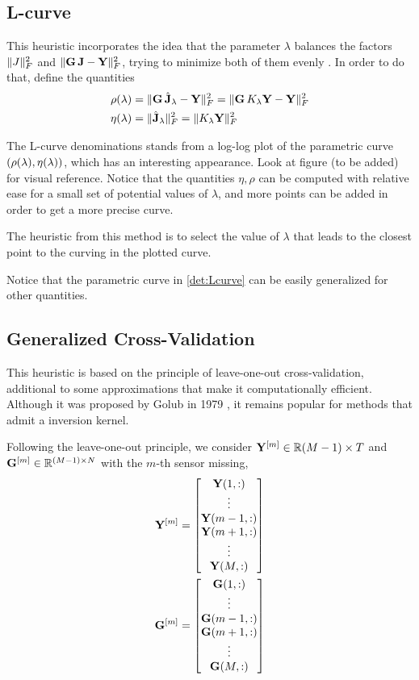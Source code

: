 \subsection{L-curve}

This heuristic incorporates the idea that the parameter $\lambda$ balances the factors $\lVert J \rVert_F^2$ and $\lVert \mathbf{G}\, \mathbf{J} - \mathbf{Y} \rVert_F^2$, trying to minimize both of them evenly \cite{Lcurve}.
%
In order to do that, define the quantities
\begin{align}
\rho(\lambda)
&=
\lVert \mathbf{G}\, \hat{\mathbf{J}}_\lambda - \mathbf{Y} \rVert_F^2
=
\lVert \mathbf{G}\, K_\lambda\mathbf{Y} - \mathbf{Y} \rVert_F^2
\\
\eta(\lambda)
&=
\lVert \hat{\mathbf{J}}_\lambda \rVert_F^2 
= 
\lVert  K_\lambda \mathbf{Y}  \rVert_F^2
\label{det:Lcurve}
\end{align}

The L-curve denominations stands from a log-log plot of the parametric curve $\left( \rho(\lambda), \eta(\lambda)  \right)$, which has an interesting appearance.
%
Look at figure (to be added) for visual reference.
%
Notice that the quantities $\eta, \rho$ can be computed with relative ease for a small set of potential values of $\lambda$, and more points can be added in order to get a more precise curve.

The heuristic from this method is to select the value of $\lambda$ that leads to the closest point to the curving in the plotted curve.

Notice that the parametric curve in \eqref{det:Lcurve} can be easily generalized for other quantities.

\subsection{Generalized Cross-Validation}

This heuristic is based on the principle of leave-one-out cross-validation, additional to some approximations that make it computationally efficient. 
%
Although it was proposed by Golub in 1979 \cite{GCV_Golub}, it remains popular for methods that admit a inversion kernel.

Following the leave-one-out principle, we consider $\mathbf{Y}^{[m]}\in\mathbb{R}{(M-1)\times T}$ and $\mathbf{G}^{[m]} \in \mathbb{R}^{(M-1)\times N}$ with the $m$-th sensor missing,
\begin{align}
\mathbf{Y}^{[m]} &=
\begin{bmatrix}
\mathbf{Y}(1,:) \\
\vdots \\
\mathbf{Y}(m-1,:) \\
\mathbf{Y}(m+1,:) \\
\vdots \\
\mathbf{Y}(M,:) 
\end{bmatrix}
\\
\mathbf{G}^{[m]} &=
\begin{bmatrix}
\mathbf{G}(1,:) \\
\vdots \\
\mathbf{G}(m-1,:) \\
\mathbf{G}(m+1,:) \\
\vdots \\
\mathbf{G}(M,:) 
\end{bmatrix}
\end{align}

